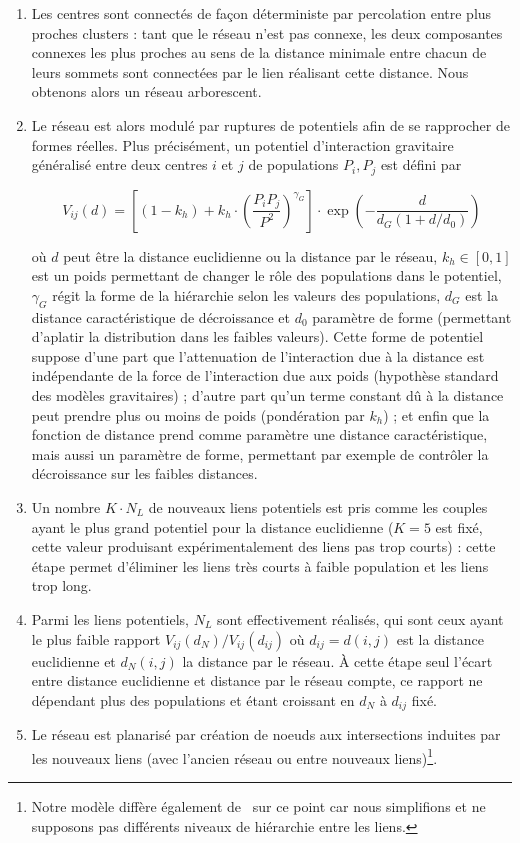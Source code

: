 {\begin{enumerate}
\item Les centres sont connectés de façon déterministe par percolation \cite{callaway2000network} entre plus proches clusters : tant que le réseau n'est pas connexe, les deux composantes connexes les plus proches au sens de la distance minimale entre chacun de leurs sommets sont connectées par le lien réalisant cette distance. Nous obtenons alors un réseau arborescent.
\item Le réseau est alors modulé par ruptures de potentiels afin de se rapprocher de formes réelles. Plus précisément, un potentiel d'interaction gravitaire généralisé entre deux centres $i$ et $j$ de populations $P_i,P_j$ est défini par

\[
V_{ij}(d) = \left[ (1 - k_h) + k_h \cdot \left( \frac{P_i P_j}{P^2} \right)^{\gamma_G} \right]\cdot \exp{\left( -\frac{d}{d_G (1 + d/d_0)} \right)}
\]

où $d$ peut être la distance euclidienne ou la distance par le réseau, $k_h \in [0,1]$ est un poids permettant de changer le rôle des populations dans le potentiel, $\gamma_G$ régit la forme de la hiérarchie selon les valeurs des populations, $d_G$ est la distance caractéristique de décroissance et $d_0$ paramètre de forme (permettant d'aplatir la distribution dans les faibles valeurs). Cette forme de potentiel suppose d'une part que l'attenuation de l'interaction due à la distance est indépendante de la force de l'interaction due aux poids (hypothèse standard des modèles gravitaires) ; d'autre part qu'un terme constant dû à la distance peut prendre plus ou moins de poids (pondération par $k_h$) ; et enfin que la fonction de distance prend comme paramètre une distance caractéristique, mais aussi un paramètre de forme, permettant par exemple de contrôler la décroissance sur les faibles distances.
\item Un nombre $K\cdot N_L$ de nouveaux liens potentiels est pris comme les couples ayant le plus grand potentiel pour la distance euclidienne ($K=5$ est fixé, cette valeur produisant expérimentalement des liens pas trop courts) : cette étape permet d'éliminer les liens très courts à faible population et les liens trop long.
\item Parmi les liens potentiels, $N_L$ sont effectivement réalisés, qui sont ceux ayant le plus faible rapport $V_{ij}(d_N)/V_{ij}(d_{ij})$ où $d_{ij}=d(i,j)$ est la distance euclidienne et $d_N(i,j)$ la distance par le réseau. À cette étape seul l'écart entre distance euclidienne et distance par le réseau compte, ce rapport ne dépendant plus des populations et étant croissant en $d_N$ à $d_{ij}$ fixé.
\item Le réseau est planarisé par création de noeuds aux intersections induites par les nouveaux liens (avec l'ancien réseau ou entre nouveaux liens)\footnote{Notre modèle diffère également de~\cite{schmitt2014modelisation} sur ce point car nous simplifions et ne supposons pas différents niveaux de hiérarchie entre les liens.}.
\end{enumerate}
}


